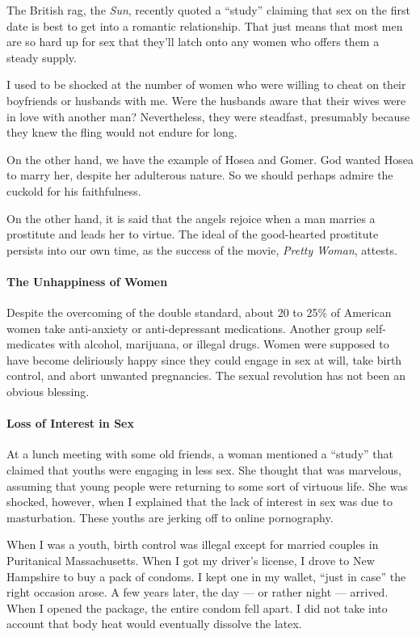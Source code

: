 The British rag, the \emph{Sun}, recently quoted a ``study'' claiming that sex on the first date is best to get into a romantic relationship. That just means that most men are so hard up for sex that they'll latch onto any women who offers them a steady supply.

I used to be shocked at the number of women who were willing to cheat on their boyfriends or husbands with me. Were the husbands aware that their wives were in love with another man? Nevertheless, they were steadfast, presumably because they knew the fling would not endure for long.

On the other hand, we have the example of Hosea and Gomer. God wanted Hosea to marry her, despite her adulterous nature. So we should perhaps admire the cuckold for his faithfulness.

On the other hand, it is said that the angels rejoice when a man marries a prostitute and leads her to virtue. The ideal of the good-hearted prostitute persists into our own time, as the success of the movie, \emph{Pretty Woman}, attests.


\paragraph{The Unhappiness of Women}


Despite the overcoming of the double standard, about 20 to 25\% of American women take anti-anxiety or anti-depressant medications. Another group self-medicates with alcohol, marijuana, or illegal drugs. Women were supposed to have become deliriously happy since they could engage in sex at will, take birth control, and abort unwanted pregnancies. The sexual revolution has not been an obvious blessing.

\paragraph{Loss of Interest in Sex}


At a lunch meeting with some old friends, a woman mentioned a ``study'' that claimed that youths were engaging in less sex. She thought that was marvelous, assuming that young people were returning to some sort of virtuous life. She was shocked, however, when I explained that the lack of interest in sex was due to masturbation. These youths are jerking off to online pornography.

When I was a youth, birth control was illegal except for married couples in Puritanical Massachusetts. When I got my driver's license, I drove to New Hampshire to buy a pack of condoms. I kept one in my wallet, ``just in case'' the right occasion arose. A few years later, the day --- or rather night --- arrived. When I opened the package, the entire condom fell apart. I did not take into account that body heat would eventually dissolve the latex.

